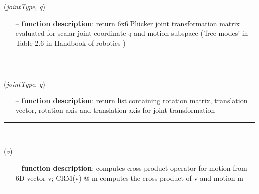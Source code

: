 \begin{itemize}[leftmargin=1.4cm]
\begin{itemize}[leftmargin=0.5cm]
\begin{itemize}[leftmargin=1.4cm]
\begin{itemize}[leftmargin=0.5cm]
\begin{itemize}[leftmargin=1.4cm]
\begin{itemize}[leftmargin=0.5cm]
\begin{itemize}[leftmargin=1.4cm]
\begin{itemize}[leftmargin=1.4cm]
\begin{itemize}[leftmargin=1.4cm]
\begin{flushleft}
\label{sec:kinematicTree:JointTransformMotionSubspace66}
({\it jointType}, {\it q})
\end{flushleft}
\setlength{\itemindent}{0.7cm}
\begin{itemize}[leftmargin=0.7cm]
  \item[--]  {\bf function description}: return 6x6 Pl\"ucker joint transformation matrix evaluated for scalar joint coordinate q and motion subspace ('free modes' in Table 2.6 in Handbook of robotics \cite{Siciliano2016})\vspace{12pt}\end{itemize}
%
\noindent\rule{8cm}{0.75pt}\vspace{1pt} \\ 
\begin{flushleft}
\label{sec:kinematicTree:JointTransformMotionSubspace}
({\it jointType}, {\it q})
\end{flushleft}
\setlength{\itemindent}{0.7cm}
\begin{itemize}[leftmargin=0.7cm]
  \item[--]  {\bf function description}: return list containing rotation matrix, translation vector, rotation axis and translation axis for joint transformation\vspace{12pt}\end{itemize}
%
\noindent\rule{8cm}{0.75pt}\vspace{1pt} \\ 
\begin{flushleft}
\label{sec:kinematicTree:CRM}
({\it v})
\end{flushleft}
\setlength{\itemindent}{0.7cm}
\begin{itemize}[leftmargin=0.7cm]
  \item[--]  {\bf function description}: computes cross product operator for motion from 6D vector v; CRM(v) @ m computes the cross product of v and motion m\vspace{12pt}\end{itemize}
%
\noindent\rule{8cm}{0.75pt}\vspace{1pt} \\ 

\end{itemize}
\end{itemize}
\end{itemize}
\end{itemize}
\end{itemize}
\end{itemize}
\end{itemize}
\end{itemize}
\end{itemize}
